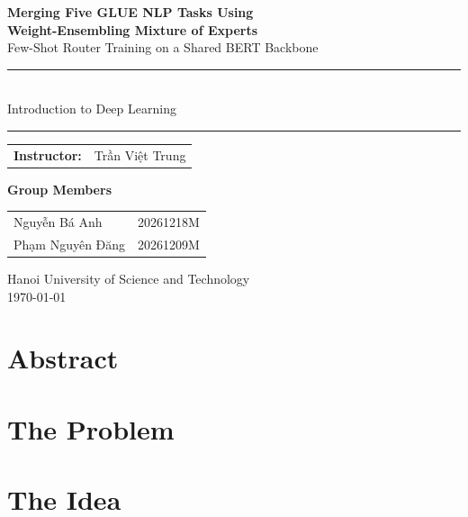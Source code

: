 \documentclass[a4paper,11pt]{report}
\begin{document}
\begin{titlepage}
    \centering
    \vspace*{3cm}

    {\LARGE\bfseries Merging Five GLUE NLP Tasks Using\\Weight-Ensembling Mixture of Experts}\\[0.4cm]
    {\Large Few-Shot Router Training on a Shared BERT Backbone}\\[2cm]

    \rule{0.8\linewidth}{0.6pt}\\[0.5cm]
    {\large Introduction to Deep Learning}\\[0.2cm]
    \rule{0.8\linewidth}{0.6pt}

    \vfill

    \begin{tabular}{ll}
        \textbf{Instructor:} & Trần Việt Trung \\
    \end{tabular}

    \vspace{0.8cm}

    \textbf{Group Members}\\[0.3cm]
    \begin{tabular}{ll}
        Nguyễn Bá Anh & 20261218M \\
        Phạm Nguyên Đăng & 20261209M \\
    \end{tabular}

    \vspace{1cm}
    {\large Hanoi University of Science and Technology}\\[0.3cm]
    {\large \today}

    \vspace*{1cm}
\end{titlepage}

\tableofcontents

\chapter*{Abstract}


\chapter{The Problem}
\label{ch:problem}


\chapter{The Idea}
\label{ch:idea}

\end{document}
